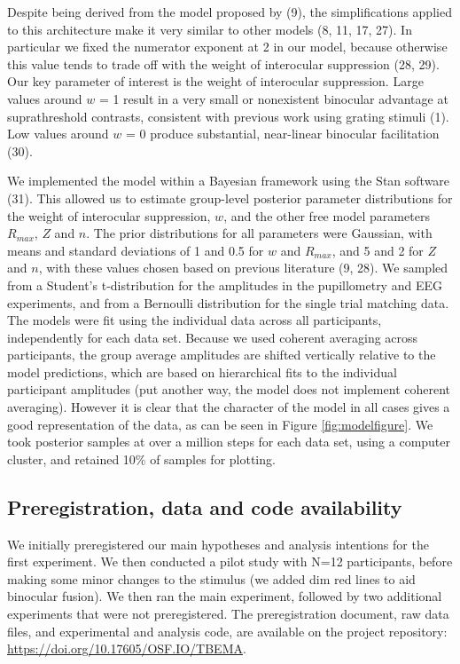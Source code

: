 \documentclass[
]{article}
\begin{document}
Despite being derived from the model proposed by (9), the simplifications applied to this architecture make it very similar to other models (8, 11, 17, 27). In particular we fixed the numerator exponent at 2 in our model, because otherwise this value tends to trade off with the weight of interocular suppression (28, 29). Our key parameter of interest is the weight of interocular suppression. Large values around \(w\) = 1 result in a very small or nonexistent binocular advantage at suprathreshold contrasts, consistent with previous work using grating stimuli (1). Low values around \(w\) = 0 produce substantial, near-linear binocular facilitation (30).

We implemented the model within a Bayesian framework using the Stan software (31). This allowed us to estimate group-level posterior parameter distributions for the weight of interocular suppression, \(w\), and the other free model parameters \(R_{max}\), \(Z\) and \(n\). The prior distributions for all parameters were Gaussian, with means and standard deviations of 1 and 0.5 for \(w\) and \(R_{max}\), and 5 and 2 for \(Z\) and \(n\), with these values chosen based on previous literature (9, 28). We sampled from a Student's t-distribution for the amplitudes in the pupillometry and EEG experiments, and from a Bernoulli distribution for the single trial matching data. The models were fit using the individual data across all participants, independently for each data set. Because we used coherent averaging across participants, the group average amplitudes are shifted vertically relative to the model predictions, which are based on hierarchical fits to the individual participant amplitudes (put another way, the model does not implement coherent averaging). However it is clear that the character of the model in all cases gives a good representation of the data, as can be seen in Figure \ref{fig:modelfigure}. We took posterior samples at over a million steps for each data set, using a computer cluster, and retained 10\% of samples for plotting.

\hypertarget{preregistration-data-and-code-availability}{%
\subsection{Preregistration, data and code availability}\label{preregistration-data-and-code-availability}}

We initially preregistered our main hypotheses and analysis intentions for the first experiment. We then conducted a pilot study with N=12 participants, before making some minor changes to the stimulus (we added dim red lines to aid binocular fusion). We then ran the main experiment, followed by two additional experiments that were not preregistered. The preregistration document, raw data files, and experimental and analysis code, are available on the project repository: \url{https://doi.org/10.17605/OSF.IO/TBEMA}.
\end{document}
